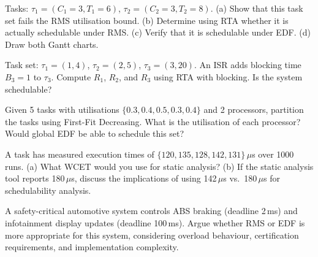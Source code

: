 \begin{exercise}
Tasks: $\tau_1 = (C_1=3, T_1=6)$, $\tau_2 = (C_2=3, T_2=8)$. (a) Show that this task set fails the RMS utilisation bound. (b) Determine using RTA whether it is actually schedulable under RMS. (c) Verify that it is schedulable under EDF. (d) Draw both Gantt charts.
\end{exercise}

\begin{exercise}
Task set: $\tau_1 = (1, 4)$, $\tau_2 = (2, 5)$, $\tau_3 = (3, 20)$. An ISR adds blocking time $B_3 = 1$ to $\tau_3$. Compute $R_1$, $R_2$, and $R_3$ using RTA with blocking. Is the system schedulable?
\end{exercise}

\begin{exercise}
Given 5 tasks with utilisations $\{0.3, 0.4, 0.5, 0.3, 0.4\}$ and 2 processors, partition the tasks using First-Fit Decreasing. What is the utilisation of each processor? Would global EDF be able to schedule this set?
\end{exercise}

\begin{exercise}
A task has measured execution times of $\{120, 135, 128, 142, 131\}\,\mu$s over 1000 runs. (a) What WCET would you use for static analysis? (b) If the static analysis tool reports 180\,$\mu$s, discuss the implications of using 142\,$\mu$s vs.\ 180\,$\mu$s for schedulability analysis.
\end{exercise}

\begin{exercise}
A safety-critical automotive system controls ABS braking (deadline 2\,ms) and infotainment display updates (deadline 100\,ms). Argue whether RMS or EDF is more appropriate for this system, considering overload behaviour, certification requirements, and implementation complexity.
\end{exercise}
